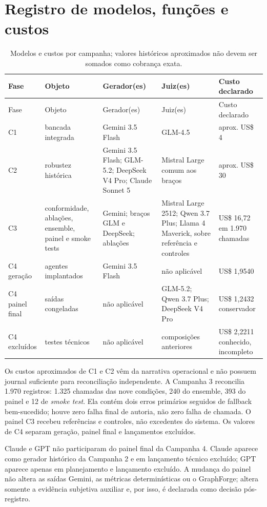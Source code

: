 \documentclass[11pt,a4paper]{article}
\begin{document}
\section{Registro de modelos, funções e custos}

\begingroup
\footnotesize
\setlength{\tabcolsep}{3pt}
\begin{longtable}{@{}P{1.25cm}P{3.0cm}P{4.1cm}P{3.7cm}P{2.2cm}@{}}
\caption{Modelos e custos por campanha; valores históricos aproximados não devem ser somados como cobrança exata.}\label{tab:s-model-costs}\\
\toprule
Fase & Objeto & Gerador(es) & Juiz(es) & Custo declarado \\
\midrule
\endfirsthead
\toprule
Fase & Objeto & Gerador(es) & Juiz(es) & Custo declarado \\
\midrule
\endhead
C1 & bancada integrada & Gemini 3.5 Flash & GLM-4.5 & aprox. US\$ 4 \\
C2 & robustez histórica & Gemini 3.5 Flash; GLM-5.2; DeepSeek V4 Pro; Claude Sonnet 5 & Mistral Large comum aos braços & aprox. US\$ 30 \\
C3 & conformidade, ablações, ensemble, painel e smoke tests & Gemini; braços GLM e DeepSeek; ablações & Mistral Large 2512; Qwen 3.7 Plus; Llama 4 Maverick, sobre referência e controles & US\$ 16,72 em 1.970 chamadas \\
C4 geração & agentes implantados & Gemini 3.5 Flash & não aplicável & US\$ 1,9540 \\
C4 painel final & saídas congeladas & não aplicável & GLM-5.2; Qwen 3.7 Plus; DeepSeek V4 Pro & US\$ 1,2432 conservador \\
C4 excluídos & testes técnicos & não aplicável & composições anteriores & US\$ 2,2211 conhecido, incompleto \\
\bottomrule
\end{longtable}
\endgroup

Os custos aproximados de C1 e C2 vêm da narrativa operacional e não possuem journal suficiente para reconciliação independente. A Campanha 3 reconcilia 1.970 registros: 1.325 chamadas das nove condições, 240 do ensemble, 393 do painel e 12 de \emph{smoke test}. Ela contém dois erros primários seguidos de fallback bem-sucedido; houve zero falha final de autoria, não zero falha de chamada. O painel C3 recebeu referências e controles, não excedentes do sistema. Os valores de C4 separam geração, painel final e lançamentos excluídos.

Claude e GPT não participaram do painel final da Campanha 4. Claude aparece como gerador histórico da Campanha 2 e em lançamento técnico excluído; GPT aparece apenas em planejamento e lançamento excluído. A mudança do painel não altera as saídas Gemini, as métricas determinísticas ou o GraphForge; altera somente a evidência subjetiva auxiliar e, por isso, é declarada como decisão pós-registro.
\end{document}
